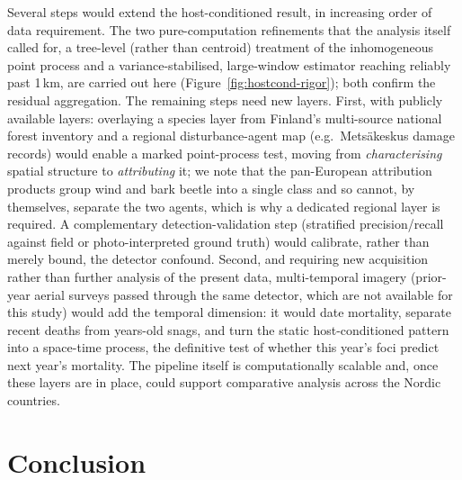\documentclass[twocolumn]{article}
\begin{document}
Several steps would extend the host-conditioned result, in increasing order of data requirement.
The two pure-computation refinements that the analysis itself called for, a tree-level (rather than
centroid) treatment of the inhomogeneous point process and a variance-stabilised, large-window
estimator reaching reliably past 1\,km, are carried out here (Figure~\ref{fig:hostcond-rigor});
both confirm the residual aggregation. The remaining steps need new layers. First,
with publicly available layers: overlaying a species layer from Finland's multi-source national
forest inventory and a regional disturbance-agent map (e.g.\ Metsäkeskus damage records) would
enable a marked point-process test, moving from \emph{characterising} spatial structure to
\emph{attributing} it; we note that the pan-European attribution products
\citep{senf2021mapping} group wind and bark beetle into a single class and so cannot, by themselves,
separate the two agents, which is why a dedicated regional layer is required. A complementary
detection-validation step (stratified precision/recall against field or photo-interpreted ground
truth) would calibrate, rather than merely bound, the detector confound. Second, and requiring new
acquisition rather than further analysis of the present data, multi-temporal imagery (prior-year
aerial surveys passed through the same detector, which are not available for this study) would add
the temporal dimension: it would date mortality, separate recent deaths from years-old snags, and
turn the static host-conditioned pattern into a space-time process, the definitive test of whether
this year's foci predict next year's mortality. The pipeline itself is computationally scalable and,
once these layers are in place, could support comparative analysis across the Nordic countries.

\section{Conclusion}
\label{sec:conclusion}
\end{document}
